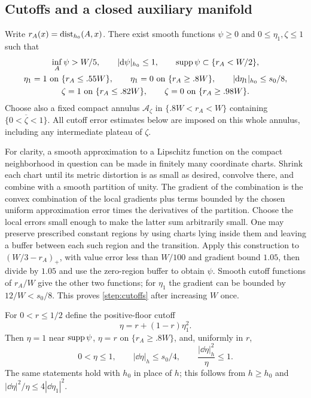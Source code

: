 \subsection{Cutoffs and a closed auxiliary manifold}

Write $r_A(x)=\operatorname{dist}_{h_0}(A,x)$.  There exist smooth functions
$\psi\ge0$ and $0\le\eta_1,\zeta\le1$ such that
\begin{equation}\label{step:cutoffs}
\begin{gathered}
 \inf_A\psi>W/5,\qquad |\mathrm d\psi|_{h_0}\le1,
 \qquad\operatorname{supp}\psi\subset\{r_A<W/2\},\\
 \eta_1=1\text{ on }\{r_A\le .55W\},\qquad
 \eta_1=0\text{ on }\{r_A\ge .8W\},\qquad
 |\mathrm d\eta_1|_{h_0}\le s_0/8,\\
 \zeta=1\text{ on }\{r_A\le .82W\},\qquad
 \zeta=0\text{ on }\{r_A\ge .98W\}.
\end{gathered}
\end{equation}
Choose also a fixed compact annulus $\mathcal A_\zeta$ in
$\{.8W<r_A<W\}$ containing $\overline{\{0<\zeta<1\}}$.
All cutoff error estimates below are imposed on this whole annulus,
including any intermediate plateau of $\zeta$.

For clarity, a
smooth approximation to a Lipschitz function on the compact neighborhood
in question can be made in finitely many coordinate charts.  Shrink each
chart until its metric distortion is as small as desired, convolve there,
and combine with a smooth partition of unity.  The gradient of the
combination is the convex combination of the local gradients plus terms
bounded by the chosen uniform approximation error times the derivatives
of the partition.  Choose the local errors small enough to make the latter
sum arbitrarily small.  One may preserve prescribed constant regions by
using charts lying inside them and leaving a buffer between each such
region and the transition.  Apply this construction to
$(W/3-r_A)_+$, with value error less than $W/100$ and gradient bound
$1.05$, then divide by $1.05$ and use the zero-region buffer to obtain
$\psi$.  Smooth cutoff functions of $r_A/W$ give the other two functions;
for $\eta_1$ the gradient can be bounded by $12/W<s_0/8$.  This proves
\cref{step:cutoffs} after increasing $W$ once.

For $0<r\le1/2$ define the positive-floor cutoff
\begin{equation}\label{step:floor}
 \eta=r+(1-r)\eta_1^2.
\end{equation}
Then $\eta=1$ near $\operatorname{supp}\psi$, $\eta=r$ on $\{r_A\ge.8W\}$,
and, uniformly in $r$,
\begin{equation}\label{step:floor-bounds}
 0<\eta\le1,\qquad |\dd\eta|_h\le s_0/4,
 \qquad \frac{|\dd\eta|_h^2}{\eta}\le1.
\end{equation}
The same statements hold with $h_0$ in place of $h$; this follows from
$h\ge h_0$ and $|\dd\eta|^2/\eta\le4|\dd\eta_1|^2$.

